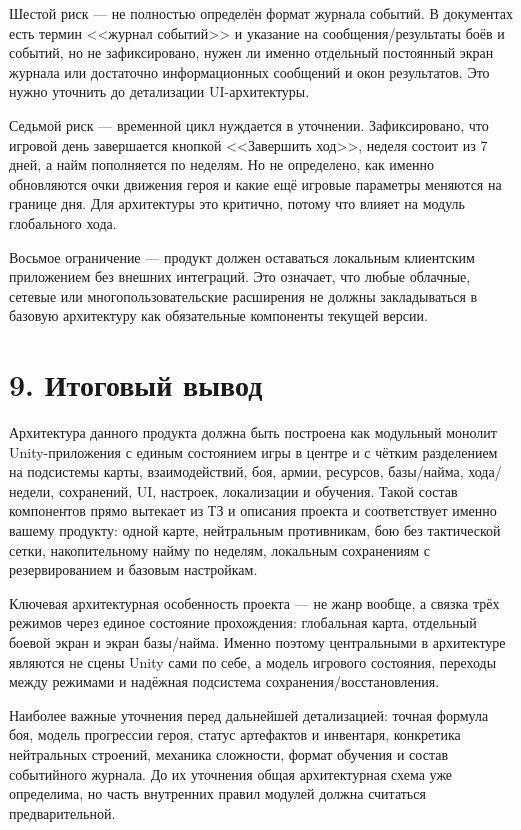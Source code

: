 \documentclass[12pt,a4paper]{article}
\begin{document}
Шестой риск --- не полностью определён формат журнала событий. В документах есть термин <<журнал событий>> и указание на сообщения/результаты боёв и событий, но не зафиксировано, нужен ли именно отдельный постоянный экран журнала или достаточно информационных сообщений и окон результатов. Это нужно уточнить до детализации UI-архитектуры.

Седьмой риск --- временной цикл нуждается в уточнении. Зафиксировано, что игровой день завершается кнопкой <<Завершить ход>>, неделя состоит из 7 дней, а найм пополняется по неделям. Но не определено, как именно обновляются очки движения героя и какие ещё игровые параметры меняются на границе дня. Для архитектуры это критично, потому что влияет на модуль глобального хода.

Восьмое ограничение --- продукт должен оставаться локальным клиентским приложением без внешних интеграций. Это означает, что любые облачные, сетевые или многопользовательские расширения не должны закладываться в базовую архитектуру как обязательные компоненты текущей версии.

\section*{9. Итоговый вывод}

Архитектура данного продукта должна быть построена как модульный монолит Unity-приложения с единым состоянием игры в центре и с чётким разделением на подсистемы карты, взаимодействий, боя, армии, ресурсов, базы/найма, хода/недели, сохранений, UI, настроек, локализации и обучения. Такой состав компонентов прямо вытекает из ТЗ и описания проекта и соответствует именно вашему продукту: одной карте, нейтральным противникам, бою без тактической сетки, накопительному найму по неделям, локальным сохранениям с резервированием и базовым настройкам.

Ключевая архитектурная особенность проекта --- не жанр вообще, а связка трёх режимов через единое состояние прохождения: глобальная карта, отдельный боевой экран и экран базы/найма. Именно поэтому центральными в архитектуре являются не сцены Unity сами по себе, а модель игрового состояния, переходы между режимами и надёжная подсистема сохранения/восстановления.

Наиболее важные уточнения перед дальнейшей детализацией: точная формула боя, модель прогрессии героя, статус артефактов и инвентаря, конкретика нейтральных строений, механика сложности, формат обучения и состав событийного журнала. До их уточнения общая архитектурная схема уже определима, но часть внутренних правил модулей должна считаться предварительной.
\end{document}
